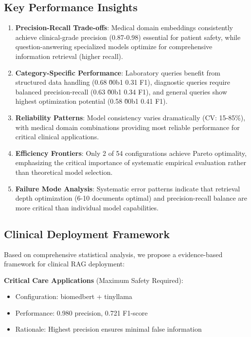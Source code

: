 \subsection{Key Performance Insights}

\begin{enumerate}
    \item \textbf{Precision-Recall Trade-offs}: Medical domain embeddings consistently achieve clinical-grade precision (0.87-0.98) essential for patient safety, while question-answering specialized models optimize for comprehensive information retrieval (higher recall).

    \item \textbf{Category-Specific Performance}: Laboratory queries benefit from structured data handling (0.68 \u00b1 0.31 F1), diagnostic queries require balanced precision-recall (0.63 \u00b1 0.34 F1), and general queries show highest optimization potential (0.58 \u00b1 0.41 F1).

    \item \textbf{Reliability Patterns}: Model consistency varies dramatically (CV: 15-85\%), with medical domain combinations providing most reliable performance for critical clinical applications.

    \item \textbf{Efficiency Frontiers}: Only 2 of 54 configurations achieve Pareto optimality, emphasizing the critical importance of systematic empirical evaluation rather than theoretical model selection.

    \item \textbf{Failure Mode Analysis}: Systematic error patterns indicate that retrieval depth optimization (6-10 documents optimal) and precision-recall balance are more critical than individual model capabilities.
\end{enumerate}

\subsection{Clinical Deployment Framework}

Based on comprehensive statistical analysis, we propose a evidence-based framework for clinical RAG deployment:

\textbf{Critical Care Applications} (Maximum Safety Required):
\begin{itemize}
    \item Configuration: biomedbert + tinyllama
    \item Performance: 0.980 precision, 0.721 F1-score
    \item Rationale: Highest precision ensures minimal false information
\end{itemize}

